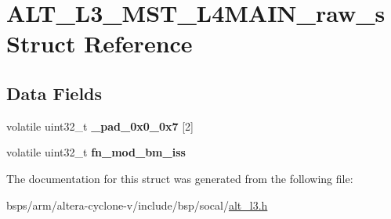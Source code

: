 \hypertarget{structALT__L3__MST__L4MAIN__raw__s}{}\section{A\+L\+T\+\_\+\+L3\+\_\+\+M\+S\+T\+\_\+\+L4\+M\+A\+I\+N\+\_\+raw\+\_\+s Struct Reference}
\label{structALT__L3__MST__L4MAIN__raw__s}
\subsection*{Data Fields}
\begin{DoxyCompactItemize}
\item 
\mbox{\label{structALT__L3__MST__L4MAIN__raw__s_a25d6faa8bd5d4b83e34a3f2e82bc20c0}} 
volatile uint32\+\_\+t {\bfseries \+\_\+pad\+\_\+0x0\+\_\+0x7} \mbox{[}2\mbox{]}
\item 
\mbox{\label{structALT__L3__MST__L4MAIN__raw__s_a52f5000065f11ee2e053b390d52ce48c}} 
volatile uint32\+\_\+t {\bfseries fn\+\_\+mod\+\_\+bm\+\_\+iss}
\end{DoxyCompactItemize}


The documentation for this struct was generated from the following file\+:\begin{DoxyCompactItemize}
\item 
bsps/arm/altera-\/cyclone-\/v/include/bsp/socal/\mbox{\hyperlink{alt__l3_8h}{alt\+\_\+l3.\+h}}\end{DoxyCompactItemize}
